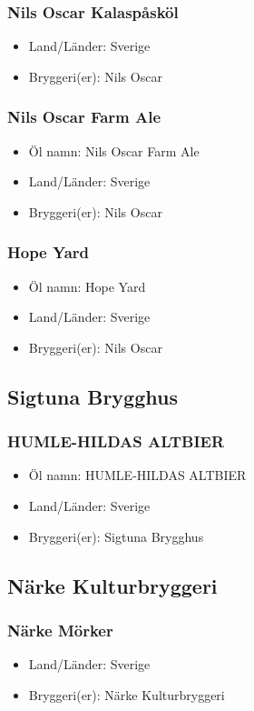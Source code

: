\documentclass[11pt]{article}
\begin{document}
\subsubsection{Nils Oscar Kalaspåsköl}
\label{sec:orged12b80}
\begin{itemize}
\item Land/Länder: Sverige
\item Bryggeri(er): Nils Oscar
\end{itemize}
\subsubsection{Nils Oscar Farm Ale}
\label{sec:org5f2e2c3}
\begin{itemize}
\item Öl namn: Nils Oscar Farm Ale
\item Land/Länder: Sverige
\item Bryggeri(er): Nils Oscar
\end{itemize}
\subsubsection{Hope Yard}
\label{sec:org025c963}
\begin{itemize}
\item Öl namn: Hope Yard
\item Land/Länder: Sverige
\item Bryggeri(er): Nils Oscar
\end{itemize}
\subsection{Sigtuna Brygghus}
\label{sec:orgc0fe5a7}
\subsubsection{HUMLE-HILDAS ALTBIER}
\label{sec:orga21d101}
\begin{itemize}
\item Öl namn: HUMLE-HILDAS ALTBIER
\item Land/Länder: Sverige
\item Bryggeri(er): Sigtuna Brygghus
\end{itemize}
\subsection{Närke Kulturbryggeri}
\label{sec:org140a8c8}
\subsubsection{Närke Mörker}
\label{sec:org81fe6dd}
\begin{itemize}
\item Land/Länder: Sverige
\item Bryggeri(er): Närke Kulturbryggeri
\end{itemize}
\end{document}
